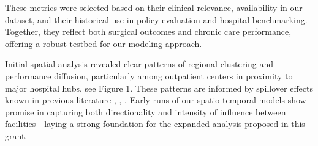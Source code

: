 \documentclass[10pt]{article}
\begin{document}
These metrics were selected based on their clinical relevance, availability in our dataset, and their historical use in policy evaluation and hospital benchmarking. Together, they reflect both surgical outcomes and chronic care performance, offering a robust testbed for our modeling approach.

Initial spatial analysis revealed clear patterns of regional clustering and performance diffusion, particularly among outpatient centers in proximity to major hospital hubs, see Figure 1. These patterns are informed by spillover effects known in previous literature \cite{francetic_framework_2022}, \cite{baltagi_hospital_2014}, \cite{yakusheva_health_2017}. Early runs of our spatio-temporal models show promise in capturing both directionality and intensity of influence between facilities---laying a strong foundation for the expanded analysis proposed in this grant.
\end{document}
